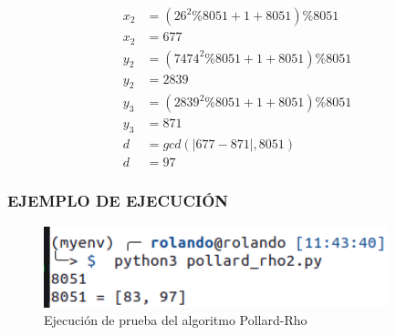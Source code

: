     \begin{align*} 
        x_2 &= (26^2\%8051 + 1 + 8051) \% 8051\\
        x_2 &= 677\\
        y_2 &= (7474^2\%8051 + 1 + 8051) \% 8051\\
        y_2 &= 2839\\
        y_3 &= (2839^2\%8051 + 1 + 8051) \% 8051\\
        y_3 &= 871\\
        d &= gcd(|677-871|, 8051)\\
        d &= 97
    \end{align*}

    \subsubsection{EJEMPLO DE EJECUCIÓN}
    \begin{figure}[H]
        \centering
        \includegraphics[width=10cm]{images/pollard_rho_prueba.png}
        \caption{Ejecución de prueba del algoritmo Pollard-Rho}
    \end{figure}


    
    
    
    

